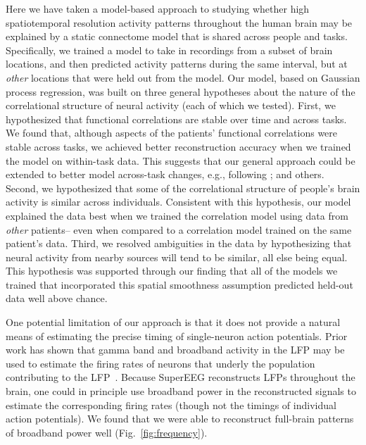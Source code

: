 \documentclass[11pt]{article}
\begin{document}
Here we have taken a model-based approach to studying whether high
spatiotemporal resolution activity patterns throughout the human brain may be
explained by a static connectome model that is shared across people and tasks.
Specifically, we trained a model to take in recordings from a subset of brain
locations, and then predicted activity patterns during the same interval, but at
\textit{other} locations that were held out from the model.  Our model, based on
Gaussian process regression, was built on three general hypotheses about the
nature of the correlational structure of neural activity (each of which we
tested).  First, we hypothesized that functional correlations are stable over
time and across tasks.  We found that, although aspects of the patients'
functional correlations were stable across tasks, we achieved better
reconstruction accuracy when we trained the model on within-task data. This
suggests that our general approach could be extended to better model across-task
changes, e.g., following \cite{ColeEtal16, TavoEtal16}; and others. Second, we
hypothesized that some of the correlational structure of people's brain activity
is similar across individuals.  Consistent with this hypothesis, our model
explained the data best when we trained the correlation model using data from
\textit{other} patients-- even when compared to a correlation model trained on
the same patient's data.  Third, we resolved ambiguities in the data by
hypothesizing that neural activity from nearby sources will tend to be similar,
all else being equal.  This hypothesis was supported through our finding that
all of the models we trained that incorporated this spatial smoothness
assumption predicted held-out data well above chance.

One potential limitation of our approach is that it does not provide a natural
means of estimating the precise timing of single-neuron action potentials. Prior
work has shown that gamma band and broadband activity in the LFP may be used to
estimate the firing rates of neurons that underly the population contributing to
the LFP~\citep{MillEtal08, MannEtal09, JacoEtal10b, CronEtal11}. Because
SuperEEG reconstructs LFPs throughout the brain, one could in principle use
broadband power in the reconstructed signals to estimate the corresponding
firing rates (though not the timings of individual action potentials).  We found
that we were able to reconstruct full-brain patterns of broadband power well
(Fig.~\ref{fig:frequency}).
\end{document}
